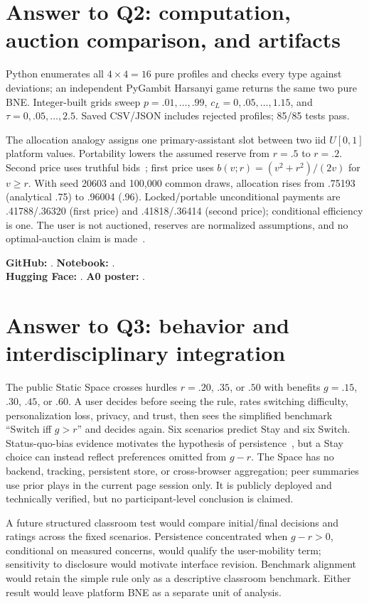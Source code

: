 \section{Answer to Q2: computation, auction comparison, and artifacts}
Python enumerates all $4\times4=16$ pure profiles and checks every type against deviations; an independent PyGambit Harsanyi game returns the same two pure BNE. Integer-built grids sweep $p=.01,\ldots,.99$, $c_L=0,.05,\ldots,1.15$, and $\tau=0,.05,\ldots,2.5$. Saved CSV/JSON includes rejected profiles; 85/85 tests pass.

The allocation analogy assigns one primary-assistant slot between two iid $U[0,1]$ platform values. Portability lowers the assumed reserve from $r=.5$ to $r=.2$. Second price uses truthful bids~\cite{vickrey1961counterspeculation}; first price uses $b(v;r)=(v^2+r^2)/(2v)$ for $v\ge r$. With seed 20603 and 100,000 common draws, allocation rises from .75193 (analytical .75) to .96004 (.96). Locked/portable unconditional payments are .41788/.36320 (first price) and .41818/.36414 (second price); conditional efficiency is one. The user is not auctioned, reserves are normalized assumptions, and no optimal-auction claim is made~\cite{myerson1981optimal}.

\textbf{GitHub:} \GitHubLink. \textbf{Notebook:} \NotebookLink.\\
\textbf{Hugging Face:} \HuggingFaceLink. \textbf{A0 poster:} \PosterLink.

\clearpage\balance
\section{Answer to Q3: behavior and interdisciplinary integration}
The public Static Space crosses hurdles $r=.20$, $.35$, or $.50$ with benefits $g=.15$, $.30$, $.45$, or $.60$. A user decides before seeing the rule, rates switching difficulty, personalization loss, privacy, and trust, then sees the simplified benchmark ``Switch iff $g>r$'' and decides again. Six scenarios predict Stay and six Switch. Status-quo-bias evidence motivates the hypothesis of persistence~\cite{samuelson1988statusquo}, but a Stay choice can instead reflect preferences omitted from $g-r$. The Space has no backend, tracking, persistent store, or cross-browser aggregation; peer summaries use prior plays in the current page session only. It is publicly deployed and technically verified, but no participant-level conclusion is claimed.

A future structured classroom test would compare initial/final decisions and ratings across the fixed scenarios. Persistence concentrated when $g-r>0$, conditional on measured concerns, would qualify the user-mobility term; sensitivity to disclosure would motivate interface revision. Benchmark alignment would retain the simple rule only as a descriptive classroom benchmark. Either result would leave platform BNE as a separate unit of analysis.

